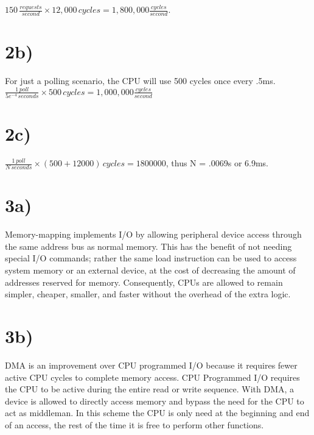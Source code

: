 \documentclass[a4paper,11pt]{article}
\begin{document}
$150 \, \frac{requests}{second} \times 12,000 \, cycles = 1,800,000 \frac{cycles}{second}$. 

\section*{2b)} 
For just a polling scenario, the CPU will use 500 cycles once every .5ms.  \\

$ \frac{1 \, poll}{5e^{-4} \, seconds} \times 500 \, cycles= 1,000,000 \frac{cycles}{second}$

\section*{2c)} 

$ \frac{1 \, poll}{N \, seconds} \times (500 + 12000)\, cycles = 1800000 $, thus N = .0069s or 6.9ms.


\section*{3a)}
Memory-mapping implements I/O by allowing peripheral device access through the same address bus as normal memory.  This has the benefit of not needing special I/O commands; rather the same load instruction can be used to access system memory or an external device, at the cost of decreasing the amount of addresses reserved for memory.  Consequently, CPUs are allowed to remain simpler, cheaper, smaller, and faster without the overhead of the extra logic. 

\section*{3b)}
DMA is an improvement over CPU programmed I/O because it requires fewer active CPU cycles to complete memory access.  CPU Programmed I/O requires the CPU to be active during the entire read or write sequence.  With DMA, a device is allowed to directly access memory and bypass the need for the CPU to act as middleman.  In this scheme the CPU is only need at the beginning and end of an access, the rest of the time it is free to perform other functions.

\end{document}
